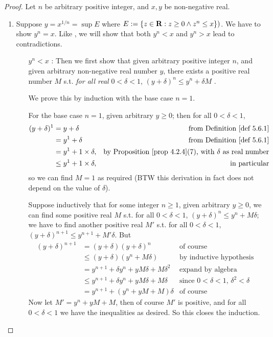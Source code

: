 \begin{proof}
Let \(n\) be arbitrary positive integer, and \(x, y\) be non-negative real.
\begin{enumerate}
\item
    Suppose \(y = x^{1 / n} = \sup E\) where \(E := \{ z \in \mathbf{R}: z \ge 0 \land z^n \le x \}) \).
    We have to show \(y^n = x\).
    Like , we will show that both \(y^n < x\) and \(y^n > x\) lead to contradictions.
    \begin{itemize}
    \item [\(y^n < x\)]:
        Then we first show that given arbitrary positive integer \(n\), and given arbitrary non-negative real number \(y\), there exists a positive real number \(M\) s.t.
        \emph{for all real} \(0 < \delta < 1\), \((y + \delta)^n \le y^n + \delta M\) \MAROON{(*)}.
        
        We prove this by induction with the base case \(n = 1\).
        
        For the base case \(n = 1\), given arbitrary \(y \ge 0\); then for all \(0 < \delta < 1\),
        \begin{align*}
        (y + \delta)^1 & = y + \delta & \text{from \DEF{5.6.1}} \\
                       & = y^1 + \delta & \text{from \DEF{5.6.1}} \\
                       & = y^1 + 1 \X \delta, & \text{by \PROP{4.2.4}(7), with \(\delta\) as real number} \\
                       & \le y^1 + 1 \X \delta, & \text{in particular}
        \end{align*}
        so we can find \(M = 1\) as required (BTW this derivation in fact does not depend on the value of \(\delta\)).
        
        Suppose inductively that for some integer \(n \ge 1\), given arbitrary \(y \ge 0\), we can find some positive real \(M\) s.t. for all \(0 < \delta < 1\), \((y + \delta)^n \le y^n + M\delta\);
        we have to find another positive real \(M'\) s.t. for all \(0 < \delta < 1\), \((y + \delta)^{n + 1} \le y^{n + 1} + M' \delta \).
        But
        \begin{align*}
            (y + \delta)^{n + 1} & = (y + \delta)(y + \delta)^n & \text{of course} \\
                                 & \le (y + \delta)(y^n + M\delta) & \text{by inductive hypothesis} \\
                                 & = y^{n + 1} + \delta y^n + yM\delta + M\delta^2 & \text{expand by algebra} \\
                                 & \le y^{n + 1} + \delta y^n + yM\delta + M\delta & \text{since \(0 < \delta < 1\), \(\delta^2 < \delta\)} \\
                                 & = y^{n + 1} + (y^n + yM + M)\delta & \text{of course}
        \end{align*}
        Now let \(M' = y^n + yM + M\), then of course \(M'\) is positive, and for all \(0 < \delta < 1\) we have the inequalities as desired.
        So this closes the induction.
        

\end{itemize}
\end{enumerate}
\end{proof}
